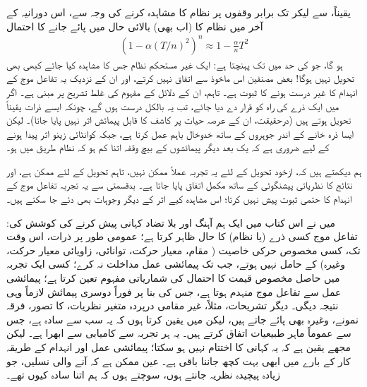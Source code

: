 یقیناً،  سے لیکر  تک  برابر وقفوں  پر نظام کا مشاہدہ کرنے کی وجہ سے، اس دورانیہ کے آخر میں نظام کا (اب بھی) بالائی حال میں پائے جانے کا احتمال 
\begin{align}
	\left(1-\alpha(T/n)^2\right)^n\approx1-\frac{\alpha}{n}T^2
\end{align}
ہو گا، جو  کی حد میں  تک پہنچتا ہے: ایک غیر مستحکم نظام جس کا  مشاہدہ کیا جائے کبھی بھی تحویل نہیں ہوگا! بعض مصنفین اس ماخوذ سے اتفاق نہیں کرتے، اور ان کے نزدیک یہ تفاعل موج کے انہدام کا غیر درست ہونے کا ثبوت ہے۔ تاہم، ان کے دلائل  کے مفہوم کی غلط تشریح پر مبنی ہے۔ اگر  میں ایک ذرے کی راہ کو  قرار دے دیا جائے، تب یہ بالکل درست ہوں گے، چونکہ ایسے ذرات یقیناً تحویل ہوتے ہیں (درحقیقت، ان کے عرصہ حیات پر کاشف کا قابل پیمائش اثر نہیں پایا جاتا)۔ لیکن ایسا ذرہ خانے کے اندر جوہروں کے ساتھ خدوخال باہم عمل کرتا ہے، جبکہ کوانٹائی زینو اثر پیدا ہونے کے لیے ضروری ہے کہ یک بعد دیگر پیمائشوں کے بیچ وقفہ اتنا کم ہو کہ نظام  طریق میں ہو۔

ہم دیکھتے ہیں کہ، ازخود تحویل کے لئے یہ تجربہ عملاً ممکن نہیں، تاہم  تحویل کے لئے ممکن ہے، اور نتائج کا نظریاتی پیشنگوئی کے ساتھ مکمل اتفاق پایا جاتا ہے۔ بدقسمتی سے یہ تجربہ تفاعل موج کے انہدام کا حتمی ثبوت پیش نہیں کرتا؛ اس مشاہدہ کیے اثر کے دیگر وجوہات بھی دئے جا سکتے ہیں۔ 

میں نے اس کتاب میں ایک ہم آہنگ اور بلا تضاد کہانی پیش کرنے کی کوشش کی: تفاعل موج  کسی ذرے (یا نظام) کا حال ظاہر کرتا ہے؛ عمومی طور پر ذرات، اس وقت تک، کسی مخصوص حرکی خاصیت ( مقام، معیار حرکت، توانائی، زاویائی معیار حرکت، وغیرہ) کے حامل نہیں ہوتے، جب تک پیمائشی عمل مداخلت نہ کرے؛ کسی ایک تجربہ میں حاصل مخصوص قیمت کا احتمال  کی شماریاتی مفہوم تعین کرتا ہے؛ پیمائشی عمل سے تفاعل موج منہدم ہوتا ہے، جس کی بنا پر فوراً دوسری پیمائش لازماً وہی نتیجہ دیگی۔ دیگر تشریحات، مثلاً، غیر مقامی درپردہ متغیر نظریات،  کا تصور،  فرقہ نمونے، وغیرہ بھی پائے جاتے ہیں، لیکن میں یقین کرتا ہوں کہ یہ سب سے سادہ ہے، جس سے عموماً ماہر طبیعیات اتفاق کرتے ہیں۔ یہ ہر تجربہ سے کامیابی سے ابھرا ہے۔ لیکن مجھے یقین ہے کہ یہ کہانی کا اختتام نہیں ہو سکتا؛ پیمائشی عمل اور انہدام کے طریقہ کار کے بارے میں ابھی بہت کچھ جاننا باقی ہے۔ عین ممکن ہے کہ آنے والی نسلیں، جو زیادہ پیچیدہ نظریہ جانتے ہوں، سوچتے ہوں کہ ہم اتنا سادہ کیوں تھے۔

